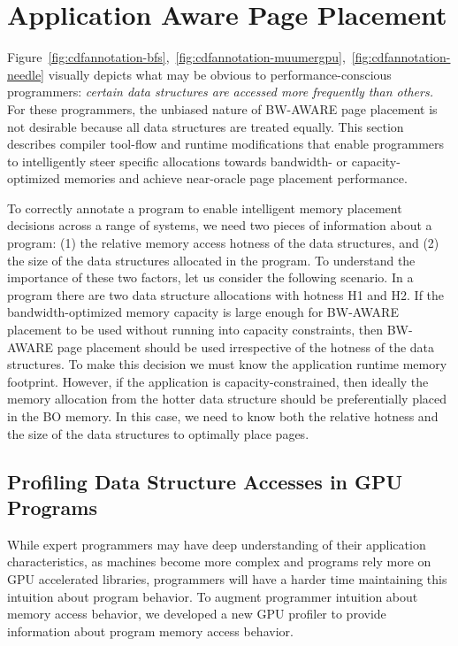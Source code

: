 \section{Application Aware Page Placement}
\label{binaryinstrument}

Figure~\ref{fig:cdfannotation-bfs},~\ref{fig:cdfannotation-muumergpu},~\ref{fig:cdfannotation-needle} 
visually depicts what may be obvious to performance-conscious programmers:
\emph{certain data structures are accessed more frequently than others.} For
these programmers, the unbiased nature of BW-AWARE page placement is not
desirable because all data structures are treated equally.  This section
describes compiler tool-flow and runtime modifications that enable programmers
to intelligently steer specific allocations towards bandwidth- or
capacity-optimized memories and achieve near-oracle page placement performance.

To correctly annotate a program to enable intelligent memory placement decisions
across a range of systems, we need two pieces of information about a program:
(1) the relative memory access hotness of the data structures, and (2) the size
of the data structures allocated in the program.  To understand the importance
of these two factors, let us consider the following scenario. In a program there
are two data structure allocations with hotness H1 and H2\@.  If the
bandwidth-optimized memory capacity is large enough for BW-AWARE placement to be
used without running into capacity constraints, then BW-AWARE page placement
should be used irrespective of the hotness of the data structures. To make this
decision we must know the application runtime memory footprint. However, if the
application is capacity-constrained, then ideally the memory allocation from the
hotter data structure should be preferentially placed in the BO memory. In this
case, we need to know both the relative hotness and the size of the data
structures to optimally place pages.

\subsection{Profiling Data Structure Accesses in GPU Programs}
\label{profiler}
While expert programmers may have deep understanding of their application
characteristics, as machines become more complex and programs rely more on GPU
accelerated libraries, programmers will have a harder time maintaining this
intuition about program behavior.  To augment programmer intuition about memory
access behavior, we developed a new GPU profiler to provide information about
program memory access behavior.  

